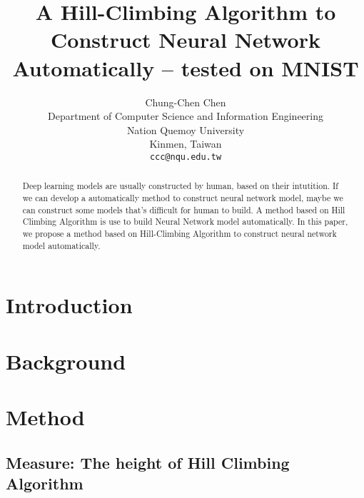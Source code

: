 \documentclass{article}
\title{A Hill-Climbing Algorithm to Construct Neural Network Automatically -- tested on MNIST}
\author{
  Chung-Chen Chen \\
  Department of Computer Science and Information Engineering\\
  Nation Quemoy University\\
  Kinmen, Taiwan \\
  \texttt{ccc@nqu.edu.tw} \\
}
\begin{document}
\maketitle

\begin{abstract}
Deep learning models are usually constructed by human, based on their intutition.
If we can develop a automatically method to construct neural network model, maybe we can construct some models that's difficult for human to build. 
A method based on Hill Climbing Algorithm is use to build Neural Network model automatically. 
In this paper, we propose a method based on Hill-Climbing Algorithm to construct neural network model automatically. 
\end{abstract}




\section{Introduction}

\section{Background}

\section{Method}

\subsection{Measure: The height of Hill Climbing Algorithm}


  


\begin{thebibliography}{1}


\end{thebibliography}
\end{document}
